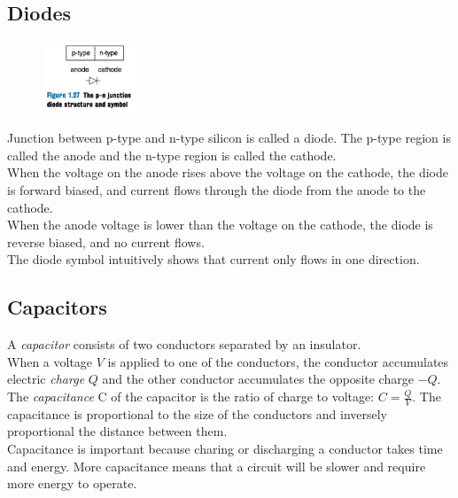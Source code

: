 \documentclass[12pt]{article}
\theoremstyle{definition}
\begin{document}
  \subsection{Diodes}
  \begin{figure}
    \centering
    \includegraphics[width=0.25\textwidth]{pictures/diode.png}
  \end{figure}
  Junction between p-type and n-type silicon is called a diode.
  The p-type region is called the anode and the n-type region is called the cathode. \\
  When the voltage on the anode rises above the voltage on the cathode, the diode is forward biased, and current flows through the diode from the anode to the cathode. \\
  When the anode voltage is lower than the voltage on the cathode, the diode is reverse biased, and no current flows. \\
  The diode symbol intuitively shows that current only flows in one direction.

  \subsection{Capacitors}
  A \emph{capacitor} consists of two conductors separated by an insulator. \\
  When a voltage $V$ is applied to one of the conductors, the conductor accumulates electric \emph{charge} $Q$ and the other conductor accumulates the opposite charge $-Q$. \\
  The \emph{capacitance} C of the capacitor is the ratio of charge to voltage: $C = \frac{Q}{V}$.
  The capacitance is proportional to the size of the conductors and inversely proportional the distance between them. \\
  Capacitance is important because charing or discharging a conductor takes time and energy. More capacitance means that a circuit will be slower and require more energy to operate.
\end{document}
